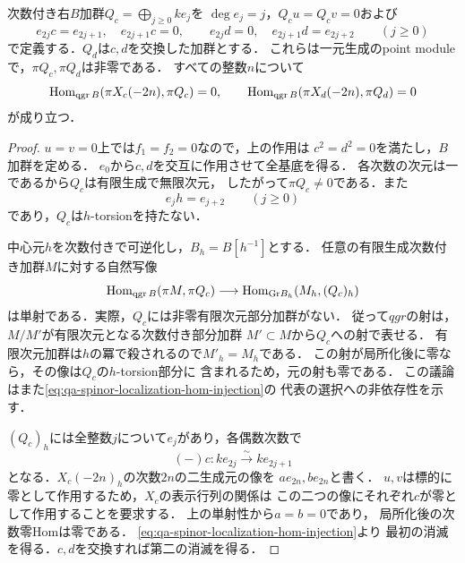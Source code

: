 \begin{lemma}
\label{lem:qa-spinor-period-two-point-orthogonality}
次数付き右$B$加群$Q_c=\bigoplus_{j\ge0}ke_j$を
$\deg e_j=j$，$Q_cu=Q_cv=0$および
\[
 e_{2j}c=e_{2j+1},\quad e_{2j+1}c=0,
 \qquad
 e_{2j}d=0,\quad e_{2j+1}d=e_{2j+2}
 \qquad(j\ge0)
\]
で定義する．$Q_d$は$c,d$を交換した加群とする．
これらは一元生成のpoint moduleで，$\pi Q_c,\pi Q_d$は非零である．
すべての整数$n$について
\begin{equation}
 \operatorname{Hom}_{\operatorname{qgr} B}(\pi X_c(-2n),\pi Q_c)=0,
 \qquad
 \operatorname{Hom}_{\operatorname{qgr} B}(\pi X_d(-2n),\pi Q_d)=0
 \label{eq:qa-spinor-point-orthogonality}
\end{equation}
が成り立つ．
\end{lemma}
\begin{proof}
$u=v=0$上では$f_1=f_2=0$なので，上の作用は
$c^2=d^2=0$を満たし，$B$加群を定める．
$e_0$から$c,d$を交互に作用させて全基底を得る．
各次数の次元は一であるから$Q_c$は有限生成で無限次元，
したがって$\pi Q_c\ne0$である．また
\[
 e_jh=e_{j+2}\qquad(j\ge0)
\]
であり，$Q_c$は$h$-torsionを持たない．

中心元$h$を次数付きで可逆化し，$B_h=B[h^{-1}]$とする．
任意の有限生成次数付き加群$M$に対する自然写像
\begin{equation}
 \operatorname{Hom}_{\operatorname{qgr} B}(\pi M,\pi Q_c)
 \longrightarrow
 \operatorname{Hom}_{\mathrm{Gr}B_h}(M_h,(Q_c)_h)
 \label{eq:qa-spinor-localization-hom-injection}
\end{equation}
は単射である．実際，$Q_c$には非零有限次元部分加群がない．
従って$qgr$の射は，$M/M'$が有限次元となる次数付き部分加群
$M'\subset M$から$Q_c$への射で表せる．
有限次元加群は$h$の冪で殺されるので$M'_h=M_h$である．
この射が局所化後に零なら，その像は$Q_c$の$h$-torsion部分に
含まれるため，元の射も零である．
この議論はまた\eqref{eq:qa-spinor-localization-hom-injection}の
代表の選択への非依存性を示す．

$(Q_c)_h$には全整数$j$について$e_j$があり，各偶数次数で
\[
 (-)c:k e_{2j}\xrightarrow{\sim}k e_{2j+1}
\]
となる．$X_c(-2n)_h$の次数$2n$の二生成元の像を
$a e_{2n},b e_{2n}$と書く．
$u,v$は標的に零として作用するため，$X_c$の表示行列の関係は
この二つの像にそれぞれ$c$が零として作用することを要求する．
上の単射性から$a=b=0$であり，
局所化後の次数零Homは零である．
\eqref{eq:qa-spinor-localization-hom-injection}より
最初の消滅を得る．$c,d$を交換すれば第二の消滅を得る．
\end{proof}

